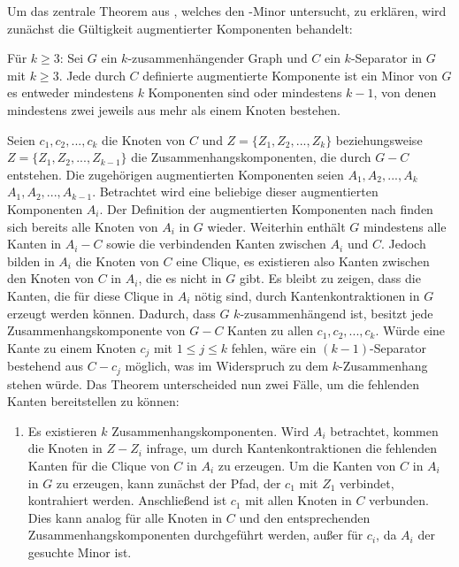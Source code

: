 Um das zentrale Theorem aus \cite{KeM92}, welches den \kdd-Minor untersucht, zu erklären, wird zunächst die Gültigkeit augmentierter Komponenten behandelt:
\begin{theorem}\label{eq:Theorem33}
  Für $k \geq 3$: Sei $G$ ein $k$-zusammenhängender Graph und $C$ ein $k$-Separator in $G$ mit $k \geq 3$.
  Jede durch $C$ definierte augmentierte Komponente ist ein Minor von $G$ \gdw es entweder mindestens $k$ Komponenten sind oder mindestens $k-1$, von denen mindestens zwei jeweils aus mehr als einem Knoten bestehen.
  \cite{KeM92}
\end{theorem}
\begin{beweis}
  Seien $c_1, c_2, ..., c_k$ die Knoten von $C$ und $Z = \{Z_1, Z_2, ..., Z_k\}$ beziehungsweise $Z = \{Z_1, Z_2, ..., Z_{k-1}\}$ die Zusammenhangskomponenten, die durch $G - C$ entstehen.
  Die zugehörigen augmentierten Komponenten seien $A_1, A_2, ..., A_k$ \bzw $A_1, A_2, ..., A_{k-1}$.
  Betrachtet wird eine beliebige dieser augmentierten Komponenten $A_i$.
  Der Definition der augmentierten Komponenten nach finden sich bereits alle Knoten von $A_i$ in $G$ wieder. %
  Weiterhin enthält $G$ mindestens alle Kanten in $A_i - C$ sowie die verbindenden Kanten zwischen $A_i$ und $C$.
  Jedoch bilden in $A_i$ die Knoten von $C$ eine Clique, es existieren also \ggf Kanten zwischen den Knoten von $C$ in $A_i$, die es nicht in $G$ gibt.
  Es bleibt zu zeigen, dass die Kanten, die für diese Clique in $A_i$ nötig sind, durch Kantenkontraktionen in $G$ erzeugt werden können.
  Dadurch, dass $G$ $k$-zusammenhängend ist, besitzt jede Zusammenhangskomponente von $G - C$ Kanten zu allen $c_1, c_2, ..., c_k$.
  Würde eine Kante zu einem Knoten $c_j$ mit $1 \leq j \leq k$ fehlen, wäre ein $(k-1)$-Separator bestehend aus $C - c_j$ möglich, was im Widerspruch zu dem $k$-Zusammenhang stehen würde.
  Das Theorem unterscheided nun zwei Fälle, um die fehlenden Kanten bereitstellen zu können:
  \begin{enumerate}
    \item Es existieren $k$ Zusammenhangskomponenten.
          Wird $A_i$ betrachtet, kommen die Knoten in $Z - Z_i$ infrage, um durch Kantenkontraktionen die fehlenden Kanten für die Clique von $C$ in $A_i$ zu erzeugen.
          Um die Kanten von $C$ in $A_i$ in $G$ zu erzeugen, kann zunächst der Pfad, der $c_1$ mit $Z_1$ verbindet, kontrahiert werden.
          Anschließend ist $c_1$ mit allen Knoten in $C$ verbunden.
          Dies kann analog für alle Knoten in $C$ und den entsprechenden Zusammenhangskomponenten durchgeführt werden, außer für $c_i$, da $A_i$ der gesuchte Minor ist.

\end{enumerate}
\end{beweis}

